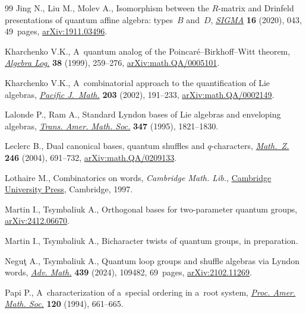 \documentclass[10pt,a4paper]{amsart}
\numberwithin{equation}{section}
\begin{document}
\begin{thebibliography}{99}
Jing N., Liu M., Molev A., Isomorphism between the {$R$}-matrix and {D}rinfeld
 presentations of quantum affine algebra: types~{$B$} and~{$D$},
 \href{https://doi.org/10.3842/SIGMA.2020.043}{\textit{SIGMA}} \textbf{16}
 (2020), 043, 49~pages,
 \href{http://arxiv.org/abs/1911.03496}{arXiv:1911.03496}.

Kharchenko V.K., A~quantum analog of the {P}oincar\'e--{B}irkhoff--{W}itt
 theorem, \href{https://doi.org/10.1007/BF02671731}{\textit{Algebra Log.}}
 \textbf{38} (1999), 259--276,
 \href{http://arxiv.org/abs/math.QA/0005101}{arXiv:math.QA/0005101}.

Kharchenko V.K., A~combinatorial approach to the quantification of {L}ie
 algebras, \href{https://doi.org/10.2140/pjm.2002.203.191}{\textit{Pacific
 J.~Math.}} \textbf{203} (2002), 191--233,
 \href{http://arxiv.org/abs/math.QA/0002149}{arXiv:math.QA/0002149}.

Lalonde P., Ram A., Standard {L}yndon bases of {L}ie algebras and enveloping
 algebras, \href{https://doi.org/10.2307/2154977}{\textit{Trans. Amer. Math.
 Soc.}} \textbf{347} (1995), 1821--1830.

Leclerc B., Dual canonical bases, quantum shuffles and {$q$}-characters,
 \href{https://doi.org/10.1007/s00209-003-0609-9}{\textit{Math.~Z.}}
 \textbf{246} (2004), 691--732,
 \href{http://arxiv.org/abs/math.QA/0209133}{arXiv:math.QA/0209133}.

Lothaire M., Combinatorics on words, \textit{Cambridge Math. Lib.},
 \href{https://doi.org/10.1017/CBO9780511566097}{Cambridge University Press},
 Cambridge, 1997.

Martin I., Tsymbaliuk A., Orthogonal bases for two-parameter quantum groups,
 \href{http://arxiv.org/abs/2412.06670}{arXiv:2412.06670}.

Martin I., Tsymbaliuk A., Bicharacter twists of quantum groups, {i}n
 preparation.

Negu\c{t} A., Tsymbaliuk A., Quantum loop groups and shuffle algebras via
 {L}yndon words, \href{https://doi.org/10.1016/j.aim.2023.109482}{\textit{Adv.
 Math.}} \textbf{439} (2024), 109482, 69~pages,
 \href{http://arxiv.org/abs/2102.11269}{arXiv:2102.11269}.

Papi P., A~characterization of a~special ordering in a~root system,
 \href{https://doi.org/10.2307/2160454}{\textit{Proc. Amer. Math. Soc.}}
 \textbf{120} (1994), 661--665.


\end{thebibliography}
\end{document}
